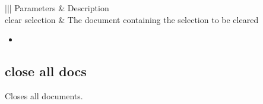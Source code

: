\documentclass[letterpaper,12pt,english,openany,oneside]{sphinxmanual}
\begin{document}
\begin{sphinxVerbatim}[commandchars=\\\{\}]
 
 \PYG{p}{[}\PYG{p}{]}
\end{sphinxVerbatim}
\label{\detokenize{IAC_API_AppleEvtObjects:parameters-14}}


\begin{savenotes}\sphinxattablestart
\centering
{}\label{\detokenize{IAC_API_AppleEvtObjects:section-29}}\nobreak
\begin{tabular}[t]{|||}
\hline
\sphinxstyletheadfamily 
Parameters
&\sphinxstyletheadfamily 
Description
\\
\hline
clear selection
&
The document containing the selection to be cleared
\\
\hline
\end{tabular}
\par
\sphinxattableend\end{savenotes}
\label{\detokenize{IAC_API_AppleEvtObjects:related-events-6}}
\begin{itemize}
\item {} 

\end{itemize}
\label{\detokenize{IAC_API_AppleEvtObjects:applescript-example-10}}

\begin{sphinxVerbatim}[commandchars=\\\{\}]
   
\end{sphinxVerbatim}
\label{\detokenize{IAC_API_AppleEvtObjects:apple-event-id-1}}

\begin{sphinxVerbatim}[commandchars=\\\{\}]
 
\end{sphinxVerbatim}




\subsection{close all docs}
\label{\detokenize{IAC_API_AppleEvtObjects:close-all-docs}}
Closes all documents.
\end{document}
